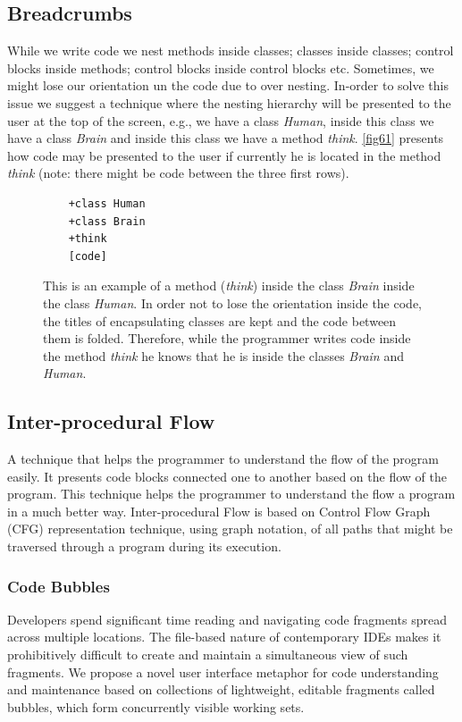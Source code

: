 \subsection{Breadcrumbs}
While we write code we nest methods inside classes; classes inside classes; control blocks inside methods; control blocks inside control blocks etc. Sometimes, we might lose our orientation un the code due to over nesting. In-order to solve this issue we suggest a technique where the nesting hierarchy will be presented to the user at the top of the screen, e.g., we have a class \textit{Human}, inside this class we have a class \textit{Brain} and inside this class we have a method \textit{think}. \autoref{fig61} presents how code may be presented to the user if currently he is located in the method \textit{think} (note: there might be code between the three first rows).
\begin{figure}[H]
	\begin{lstlisting}
	+class Human
	+class Brain
	+think
	[code]
	\end{lstlisting}
	\caption{This is an example of a method (\textit{think}) inside the class \textit{Brain} inside the class \textit{Human}. In order not to lose the orientation inside the code, the titles of encapsulating classes are kept and the code between them is folded. Therefore, while the programmer writes code inside the method \textit{think} he knows that he is inside the classes \textit{Brain} and \textit{Human}.}
	\label{fig61}
\end{figure}
\subsection{Inter-procedural Flow}
A technique that helps the programmer to understand the flow of the program easily. It presents code blocks connected one to another based on the flow of the program. This technique helps the programmer to understand the flow a program in a much better way. Inter-procedural Flow is based on Control Flow Graph (CFG) representation technique, using graph notation, of all paths that might be traversed through a program during its execution.
\subsubsection{Code Bubbles}
Developers spend significant time reading and navigating code fragments spread across multiple locations. The file-based nature of contemporary IDEs makes it prohibitively difficult to create and maintain a simultaneous view of such fragments. We propose a novel user interface metaphor for code understanding and maintenance based on collections of lightweight, editable fragments called bubbles, which form concurrently visible working sets.

